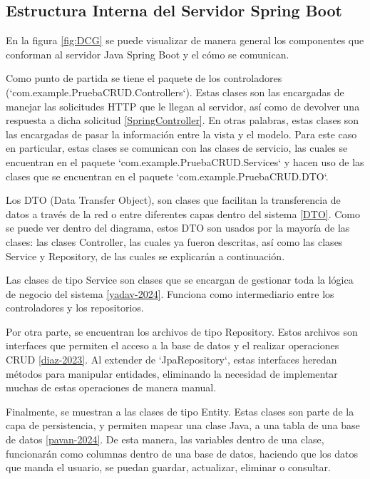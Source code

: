 \subsection{Estructura Interna del Servidor Spring Boot}
En la figura \ref{fig:DCG} se puede visualizar de manera general los componentes que conforman al servidor Java Spring Boot y el cómo se comunican.

Como punto de partida se tiene el paquete de los controladores (`com.example.PruebaCRUD.Controllers`). Estas clases son las encargadas de manejar las solicitudes HTTP que le llegan al servidor, así como de devolver una respuesta a dicha solicitud \ref{SpringController}. En otras palabras, estas clases son las encargadas de pasar la información entre la vista y el modelo. Para este caso en particular, estas clases se comunican con las clases de servicio, las cuales se encuentran en el paquete `com.example.PruebaCRUD.Services` y hacen uso de las clases que se encuentran en el paquete `com.example.PruebaCRUD.DTO`. 

Los DTO (Data Transfer Object), son clases que facilitan la transferencia de datos a través de la red o entre diferentes capas dentro del sistema \ref{DTO}. Como se puede ver dentro del diagrama, estos DTO son usados por la mayoría de las clases: las clases Controller, las cuales ya fueron descritas, así como las clases Service y Repository, de las cuales se explicarán a continuación.

Las clases de tipo Service son clases que se encargan de gestionar toda la lógica de negocio del sistema \ref{yadav-2024}. Funciona como intermediario entre los controladores y los repositorios.

Por otra parte, se encuentran los archivos de tipo Repository. Estos archivos son interfaces que permiten el acceso a la base de datos y el realizar operaciones CRUD \ref{diaz-2023}. Al extender de `JpaRepository`, estas interfaces heredan métodos para manipular entidades, eliminando la necesidad de implementar muchas de estas operaciones de manera manual.

Finalmente, se muestran a las clases de tipo Entity. Estas clases son parte de la capa de persistencia, y permiten mapear una clase Java, a una tabla de una base de datos \ref{pavan-2024}. De esta manera, las variables dentro de una clase, funcionarán como columnas dentro de una base de datos, haciendo que los datos que manda el usuario, se puedan guardar, actualizar, eliminar o consultar.

